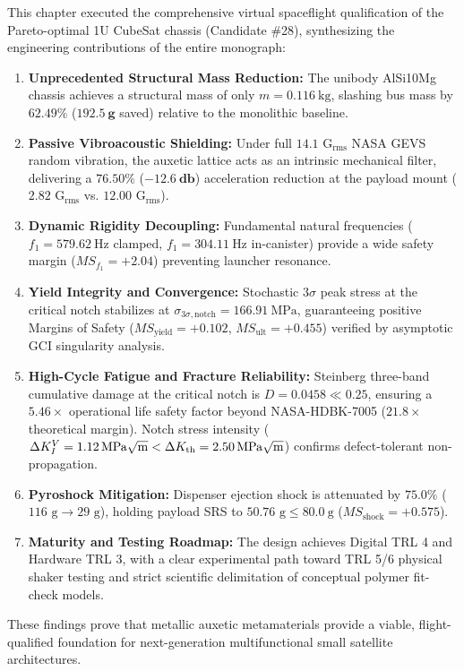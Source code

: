 This chapter executed the comprehensive virtual spaceflight qualification of the Pareto-optimal 1U CubeSat chassis (Candidate \#28), synthesizing the engineering contributions of the entire monograph:
\begin{enumerate}
\item \textbf{Unprecedented Structural Mass Reduction:} The unibody AlSi10Mg chassis achieves a structural mass of only $m = \SI{0.116}{\kilo\gram}$, slashing bus mass by $\mathbf{62.49\%}$ ($\mathbf{192.5\ \si{\gram}}$ saved) relative to the monolithic baseline.
\item \textbf{Passive Vibroacoustic Shielding:} Under full $14.1\text{ G}_{\text{rms}}$ NASA GEVS random vibration, the auxetic lattice acts as an intrinsic mechanical filter, delivering a $\mathbf{76.50\%}$ ($\mathbf{-12.6\ \si{\decibel}}$) acceleration reduction at the payload mount ($2.82\text{ G}_{\text{rms}}$ vs. $12.00\text{ G}_{\text{rms}}$).
\item \textbf{Dynamic Rigidity Decoupling:} Fundamental natural frequencies ($f_1 = \SI{579.62}{\hertz}$ clamped, $f_1 = \SI{304.11}{\hertz}$ in-canister) provide a wide safety margin ($MS_{f_1} = +2.04$) preventing launcher resonance.
\item \textbf{Yield Integrity and Convergence:} Stochastic $3\sigma$ peak stress at the critical notch stabilizes at $\sigma_{3\sigma,\text{notch}} = \SI{166.91}{\mega\pascal}$, guaranteeing positive Margins of Safety ($MS_{\text{yield}} = +0.102$, $MS_{\text{ult}} = +0.455$) verified by asymptotic GCI singularity analysis.
\item \textbf{High-Cycle Fatigue and Fracture Reliability:} Steinberg three-band cumulative damage at the critical notch is $D = 0.0458 \ll 0.25$, ensuring a $5.46\times$ operational life safety factor beyond NASA-HDBK-7005 ($21.8\times$ theoretical margin). Notch stress intensity ($\Delta K_I^V = \SI{1.12}{\mega\pascal\sqrt{\meter}} < \Delta K_{\text{th}} = \SI{2.50}{\mega\pascal\sqrt{\meter}}$) confirms defect-tolerant non-propagation.
\item \textbf{Pyroshock Mitigation:} Dispenser ejection shock is attenuated by $75.0\%$ ($116\text{ g} \to 29\text{ g}$), holding payload SRS to $50.76\text{ g} \le \SI{80.0}{\text{g}}$ ($MS_{\text{shock}} = +0.575$).
\item \textbf{Maturity and Testing Roadmap:} The design achieves Digital TRL 4 and Hardware TRL 3, with a clear experimental path toward TRL 5/6 physical shaker testing and strict scientific delimitation of conceptual polymer fit-check models.
\end{enumerate}

These findings prove that metallic auxetic metamaterials provide a viable, flight-qualified foundation for next-generation multifunctional small satellite architectures.
